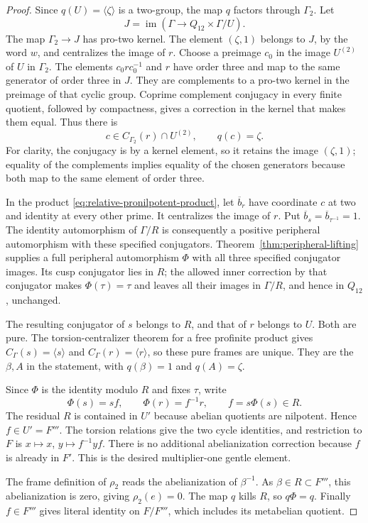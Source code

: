 \begin{proof}
Since $q(U)=\langle\zeta\rangle$ is a two-group, the map $q$
factors through $\Gamma_2$. Let
\[
 J=\operatorname{im}(\Gamma\longrightarrow Q_{12}\times\Gamma/U).
\]
The map $\Gamma_2\to J$ has pro-two kernel. The element
$(\zeta,1)$ belongs to $J$, by the word $w$, and centralizes the
image of $r$. Choose a preimage $c_0$ in the image $U^{(2)}$ of
$U$ in $\Gamma_2$. The elements $c_0rc_0^{-1}$ and $r$ have
order three and map to the same generator of order three in $J$.
They are complements to a pro-two kernel in the preimage of that
cyclic group. Coprime complement conjugacy in every finite quotient,
followed by compactness, gives a correction in the kernel that
makes them equal. Thus there is
\[
 c\in C_{\Gamma_2}(r)\cap U^{(2)},\qquad q(c)=\zeta.
\]
For clarity, the conjugacy is by a kernel element, so it retains
the image $(\zeta,1)$; equality of the complements implies equality
of the chosen generators because both map to the same element of
order three.

In the product \eqref{eq:relative-pronilpotent-product}, let
$\overline b_r$ have coordinate $c$ at two and identity at every
other prime. It centralizes the image of $r$. Put
$\overline b_s=\overline b_{\tau^{-1}}=1$.
The identity automorphism of $\Gamma/R$ is consequently a positive
peripheral automorphism with these specified conjugators.
Theorem~\ref{thm:peripheral-lifting} supplies a full peripheral
automorphism $\Phi$ with all three specified conjugator images. Its cusp
conjugator lies in $R$; the allowed inner correction by that
conjugator makes $\Phi(\tau)=\tau$ and leaves all their images
in $\Gamma/R$, and hence in $Q_{12}$, unchanged.

The resulting conjugator of $s$ belongs to $R$, and that of $r$
belongs to $U$. Both are pure. The torsion-centralizer theorem for
a free profinite product gives $C_\Gamma(s)=\langle s\rangle$
and $C_\Gamma(r)=\langle r\rangle$, so these pure frames are
unique. They are the $\beta,A$ in the statement, with
$q(\beta)=1$ and $q(A)=\zeta$.

Since $\Phi$ is the identity modulo $R$ and fixes $\tau$, write
\[
 \Phi(s)=sf,\qquad \Phi(r)=f^{-1}r,
       \qquad f=s\Phi(s)\in R.
\]
The residual $R$ is contained in $U'$ because abelian quotients are
nilpotent. Hence $f\in U'=F'''$. The torsion relations give the
two cycle identities, and restriction to $F$ is
$x\mapsto x$, $y\mapsto f^{-1}yf$. There is no additional
abelianization correction because $f$ is already in $F'$.
This is the desired multiplier-one gentle element.

The frame definition of $\rho_2$ reads the abelianization of
$\beta^{-1}$. As $\beta\in R\subset F'''$, this abelianization
is zero, giving $\rho_2(e)=0$. The map $q$ kills $R$, so
$q\Phi=q$. Finally $f\in F'''$ gives literal identity on
$F/F'''$, which includes its metabelian quotient.
\end{proof}

